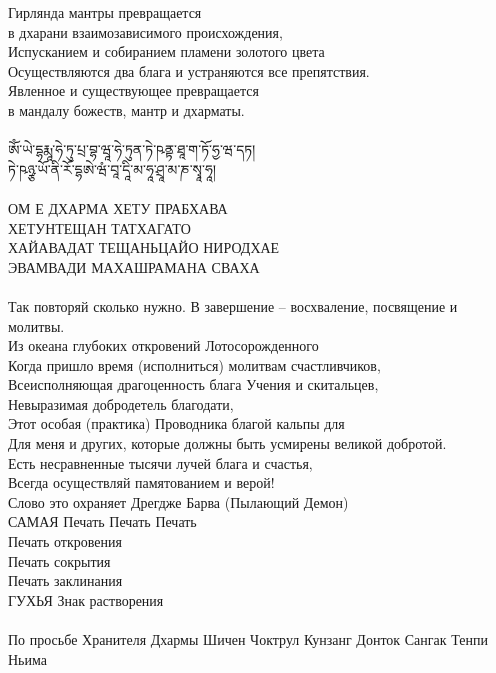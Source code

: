 \newpage
Гирлянда мантры превращается \\ \indent в дхарани взаимозависимого происхождения,\\
Испусканием и собиранием пламени золотого цвета\\
Осуществляются два блага и устраняются все препятствия.\\
Явленное и существующее превращается \\ \indent в мандалу божеств, мантр и дхарматы.\\
\ti \\
ཨོཾ་ཡེ་དྷརྨཱ་ཧེ་ཏུ་པྲ་བྷ་ཝཱ་ཧེ་ཏུན་ཏེ་ཥནྟ་ཐཱ་ག་ཏོ་ཧྱ་ཝ་དཏ།\\
ཏེ་ཥཉྩ་ཡོ་ནི་རོ་དྷཨེ་ཝཾ་བཱ་དཱི་མ་ཧཱ་ཤྲཱ་མ་ཎ་སྭཱ་ཧཱ།\\
\ru
\\
ОМ Е ДХАРМА ХЕТУ ПРАБХАВА \\
ХЕТУНТЕЩАН ТАТХАГАТО \\
ХАЙАВАДАТ ТЕЩАНЬЦАЙО НИРОДХАЕ\\
ЭВАМВАДИ МАХАШРАМАНА СВАХА\\
\\
\scriptsize
Так повторяй сколько нужно. В завершение – восхваление, посвящение и молитвы.\\
Из океана глубоких откровений Лотосорожденного\\
Когда пришло время (исполниться) молитвам счастливчиков,\\
Всеисполняющая драгоценность блага Учения и скитальцев,\\
Невыразимая добродетель благодати,\\
Этот особая (практика) Проводника благой кальпы для\\
Для меня и других, которые должны быть усмирены великой добротой.\\
Есть несравненные тысячи лучей блага и счастья,\\
Всегда осуществляй памятованием и верой!\\
Слово это охраняет Дрегдже Барва (Пылающий Демон)\\
САМАЯ Печать Печать Печать \\
Печать откровения \\
Печать сокрытия \\
Печать заклинания \\
ГУХЬЯ Знак растворения\\
\\
По просьбе Хранителя Дхармы Шичен Чоктрул Кунзанг Донток Сангак Тенпи Ньима
